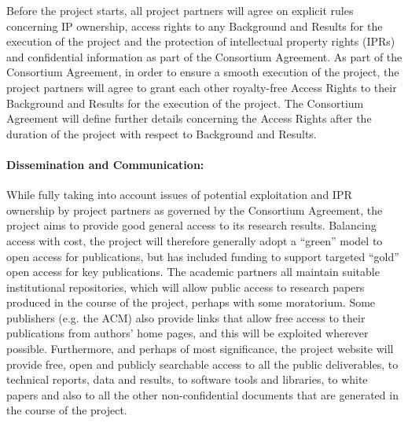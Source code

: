 \documentclass[a4paper,11pt]{article}
\begin{document}

Before the project starts, all project partners will agree on explicit rules concerning IP ownership, access rights to any
Background and Results for the execution of the project and the
protection of intellectual property rights (IPRs) and confidential
information as part of the Consortium Agreement.
As part of the Consortium Agreement, in order to ensure a smooth
execution of the project, the project partners will agree to grant each other
royalty-free Access Rights to their Background and Results for the
execution of the project. The Consortium Agreement will define further
details concerning the Access Rights after the duration of the project 
with respect to Background and Results.

\paragraph{Dissemination and Communication:}
While fully taking into account issues of potential exploitation and IPR ownership by project partners
as governed by the Consortium Agreement,
the project aims to provide good general access to its research results.
Balancing access with cost, the project will therefore generally adopt a ``green'' model to open access for publications,
but has included funding to support targeted ``gold'' open access for key publications.
The academic partners all maintain suitable institutional repositories, which will allow public access to research papers produced in the
course of the project, perhaps with some moratorium.  Some publishers (e.g. the ACM) also provide links that allow
free access to their publications from authors' home pages, and this will be exploited wherever possible.
%
Furthermore, and perhaps of most significance, the project website will provide free,
open and publicly searchable access to all the public deliverables, to technical reports, data and results, to software tools
and libraries, to white papers and also to all
the other non-confidential documents that are generated in the course of the project.  
\end{document}
